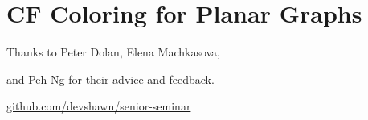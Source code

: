\documentclass[xcolor=dvipsnames,aspectratio=1610]{beamer}
\begin{document}
  \section{CF Coloring for Planar Graphs}

  \begin{frame}[standout]
    \centering
    {Thanks to Peter Dolan, Elena Machkasova,

    and Peh Ng for their advice and feedback.}
    \vfill
    \href{https://github.com/devshawn/senior-seminar}{github.com/devshawn/senior-seminar}
    \vfill
    \ccbyncsa{}
  \end{frame}
\end{document}
